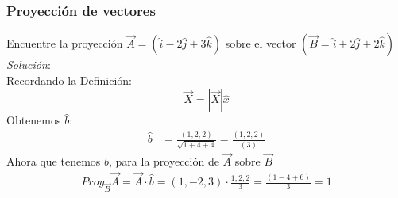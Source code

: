 \documentclass[12pt,openany]{book}
\begin{document}
			\subsubsection{Proyecci\'on de vectores}
				\noindent Encuentre la proyecci\'on $\vec{A}=(\hat{i}-2\hat{j}+3\hat{k})$ sobre el vector 
				$(\vec{B}=\hat{i}+2\hat{j}+2\hat{k})$
				\noindent\textsl{Soluci\'on}:\\
				Recordando la Definici\'on:
				$$ \vec{X}=|\vec{X}|\hat{x}$$
				Obtenemos $\hat{b}$:
				\begin{equation*}
					\begin{split}
						\hat{b}&=\frac{(1,2,2)}{\sqrt{1+4+4}}=\frac{(1,2,2)}{(3)}
					\end{split}
				\end{equation*}
				Ahora que tenemos $\hat{b}$, para la proyecci\'on de $\vec{A}$ sobre $\vec{B}$
				\begin{equation*}
					\begin{split}
						Proy_{\vec{B}}\vec{A}=\vec{A}\cdot\hat{b}
																   =(1,-2,3)\cdot\frac{1,2,2}{3}
																   =\frac{(1-4+6)}{3}
																   =1
					\end{split}
				\end{equation*}
\end{document}
